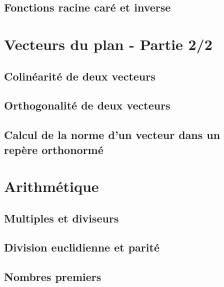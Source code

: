 \documentclass[10pt,a4paper]{article}
\theoremstyle{definition}
\theoremstyle{definition}
\begin{document}
\subsection{Fonctions racine caré et inverse}

\section{Vecteurs du plan - Partie 2/2}
\subsection{Colinéarité de deux vecteurs}
\subsection{Orthogonalité de deux vecteurs}
\subsection{Calcul de la norme d'un vecteur dans un repère orthonormé}

\section{Arithmétique}
\subsection{Multiples et diviseurs}
\subsection{Division euclidienne et parité}
\subsection{Nombres premiers}
\end{document}
